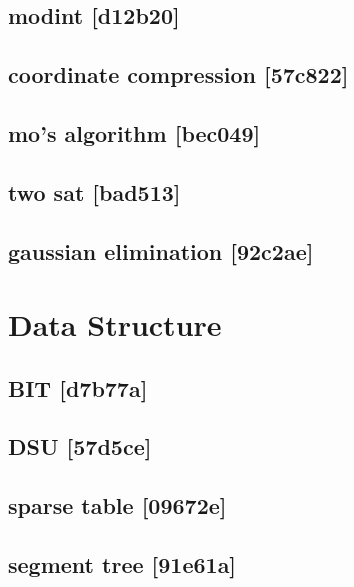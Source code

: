 \subsection{modint {\footnotesize [d12b20]} }

\subsection{coordinate compression {\footnotesize [57c822]} }

\subsection{mo's algorithm {\footnotesize [bec049]} }

\subsection{two sat {\footnotesize [bad513]} }

\subsection{gaussian elimination {\footnotesize [92c2ae]} }


\section{Data Structure}
\subsection{BIT {\footnotesize [d7b77a]} }

\subsection{DSU {\footnotesize [57d5ce]} }

\subsection{sparse table {\footnotesize [09672e]} }

\subsection{segment tree {\footnotesize [91e61a]} }

